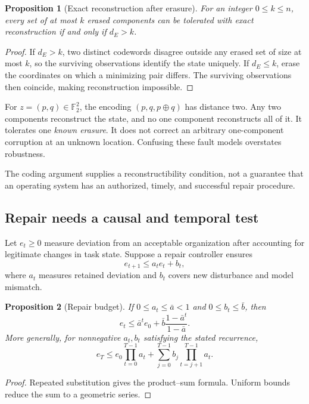 \documentclass[11pt,letterpaper]{article}
\theoremstyle{plain}
\newtheorem{proposition}{Proposition}[section]
\theoremstyle{definition}
\theoremstyle{remark}
\newcommand{\Ftwo}{\mathbb F_2}
\begin{document}
\begin{proposition}[Exact reconstruction after erasure]\label{prop:erasure}
For an integer $0\leq k\leq n$, every set of at most $k$ erased components can be tolerated with exact reconstruction if and only if $d_E>k$.
\end{proposition}
\begin{proof}
If $d_E>k$, two distinct codewords disagree outside any erased set of size at most $k$, so the surviving observations identify the state uniquely. If $d_E\leq k$, erase the coordinates on which a minimizing pair differs. The surviving observations then coincide, making reconstruction impossible.
\end{proof}

For $z=(p,q)\in\Ftwo^2$, the encoding $(p,q,p\oplus q)$ has distance two. Any two components reconstruct the state, and no one component reconstructs all of it. It tolerates one \emph{known erasure}. It does not correct an arbitrary one-component corruption at an unknown location. Confusing these fault models overstates robustness.

The coding argument supplies a reconstructibility condition, not a guarantee that an operating system has an authorized, timely, and successful repair procedure.

\subsection{Repair needs a causal and temporal test}
Let $e_t\geq0$ measure deviation from an acceptable organization after accounting for legitimate changes in task state. Suppose a repair controller ensures
\[
e_{t+1}\leq a_t e_t+b_t,
\]
where $a_t$ measures retained deviation and $b_t$ covers new disturbance and model mismatch.

\begin{proposition}[Repair budget]\label{prop:repair}
If $0\leq a_t\leq\bar a<1$ and $0\leq b_t\leq\bar b$, then
\[
e_t\leq \bar a^t e_0+\bar b\frac{1-\bar a^t}{1-\bar a}.
\]
More generally, for nonnegative $a_t,b_t$ satisfying the stated recurrence,
\[
e_T\leq e_0\prod_{t=0}^{T-1}a_t+
\sum_{j=0}^{T-1}b_j\prod_{t=j+1}^{T-1}a_t.
\]
\end{proposition}
\begin{proof}
Repeated substitution gives the product--sum formula. Uniform bounds reduce the sum to a geometric series.
\end{proof}
\end{document}
